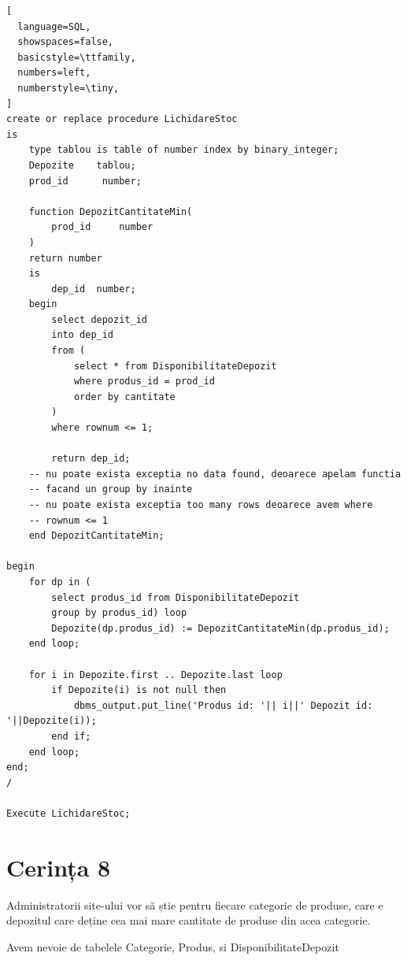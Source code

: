 \documentclass[12pt]{article}
\begin{document}
\vspace{0.5em}

\begin{lstlisting}[
  language=SQL,
  showspaces=false,
  basicstyle=\ttfamily,
  numbers=left,
  numberstyle=\tiny,
]
create or replace procedure LichidareStoc
is
    type tablou is table of number index by binary_integer;
    Depozite    tablou;
    prod_id      number;
    
    function DepozitCantitateMin(
        prod_id     number
    )
    return number
    is
        dep_id  number;
    begin
        select depozit_id
        into dep_id
        from (
            select * from DisponibilitateDepozit
            where produs_id = prod_id
            order by cantitate
        )
        where rownum <= 1;
        
        return dep_id;
    -- nu poate exista exceptia no data found, deoarece apelam functia 
    -- facand un group by inainte
    -- nu poate exista exceptia too many rows deoarece avem where
    -- rownum <= 1
    end DepozitCantitateMin;
    
begin
    for dp in (
        select produs_id from DisponibilitateDepozit
        group by produs_id) loop
        Depozite(dp.produs_id) := DepozitCantitateMin(dp.produs_id);
    end loop;
    
    for i in Depozite.first .. Depozite.last loop
        if Depozite(i) is not null then
            dbms_output.put_line('Produs id: '|| i||' Depozit id: '||Depozite(i));
        end if;
    end loop;
end;
/

Execute LichidareStoc;
\end{lstlisting}

\pagebreak

\section{Cerința 8}
Administratorii site-ului vor să știe pentru fiecare categorie de produse,
care e depozitul care deține cea mai mare cantitate de produse din acea
categorie.

Avem nevoie de tabelele Categorie, Produs, si DisponibilitateDepozit

\vspace{0.5em}
\end{document}
